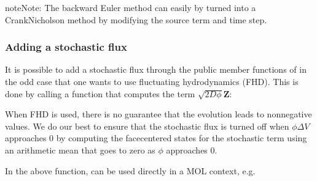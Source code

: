 \documentclass[letterpaper,10pt,english]{sphinxmanual}
\begin{document}
\begin{sphinxadmonition}{note}{Note:}
\sphinxAtStartPar
The backward Euler method can easily by turned into a Crank\sphinxhyphen{}Nicholson method by modifying the source term and time step.
\end{sphinxadmonition}


\subsubsection{Adding a stochastic flux}
\label{\detokenize{Solvers/CDR:adding-a-stochastic-flux}}
\sphinxAtStartPar
It is possible to add a stochastic flux through the public member functions of  in the odd case that one wants to use fluctuating hydrodynamics (FHD).
This is done by calling a function that computes the term \(\sqrt{2D\phi}\mathbf{Z}\):

\begin{sphinxVerbatim}[commandchars=\\\{\},formatcom=\scriptsize]
     
\end{sphinxVerbatim}

\sphinxAtStartPar
When FHD is used, there is no guarantee that the evolution leads to non\sphinxhyphen{}negative values.
We do our best to ensure that the stochastic flux is turned off when \(\phi \Delta V\) approaches 0 by computing the face\sphinxhyphen{}centered states for the stochastic term using an arithmetic mean that goes to zero as \(\phi\) approaches 0.

\sphinxAtStartPar
In the above function,  can be used directly in a MOL context, e.g.
\end{document}
